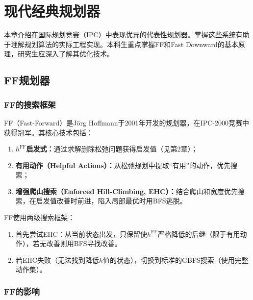 \chapter{现代经典规划器 \ug}

\begin{levelbox}
本章介绍在国际规划竞赛（IPC）中表现优异的代表性规划器。掌握这些系统有助于理解规划算法的实际工程实现。本科生重点掌握FF和Fast Downward的基本原理，研究生应深入了解其优化技术。
\end{levelbox}

\section{FF规划器 \ug}

\subsection{FF的搜索框架}

FF（Fast-Forward）是Jörg Hoffmann于2001年开发的规划器，在IPC-2000竞赛中获得冠军。其核心技术包括：

\begin{enumerate}
  \item \textbf{$h^{\mathrm{FF}}$启发式：}通过求解删除松弛问题获得启发值（见第2章）；
  \item \textbf{有用动作（Helpful Actions）：}从松弛规划中提取``有用''的动作，优先搜索；
  \item \textbf{增强爬山搜索（Enforced Hill-Climbing, EHC）：}结合爬山和宽度优先搜索，在启发值改善时前进，陷入局部最优时用BFS逃脱。
\end{enumerate}

\begin{algbox}[title={\textbf{FF的搜索策略}}]
FF使用两级搜索框架：
\begin{enumerate}
  \item 首先尝试EHC：从当前状态出发，只保留使$h^{\mathrm{FF}}$严格降低的后继（限于有用动作），若无改善则用BFS寻找改善。
  \item 若EHC失败（无法找到降低$h$值的状态），切换到标准的GBFS搜索（使用完整动作集）。
\end{enumerate}
\end{algbox}

\subsection{FF的影响}

